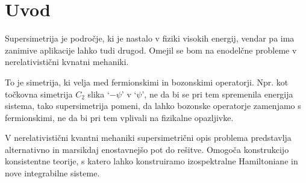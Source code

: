 \section{Uvod}

Supersimetrija je podro\v cje, ki je nastalo v fiziki visokih energij, vendar pa ima zanimive aplikacije lahko
tudi drugod. Omejil se bom na enodel\v cne probleme v nerelativisti\v cni kvnatni mehaniki.

To je simetrija, ki velja med fermionskimi in bozonskimi operatorji. Npr. kot to\v ckovna
simetrija $C_2$ slika `$-\psi$' v `$\psi$', ne da bi se pri tem spremenila energija sistema, tako supersimetrija pomeni, da lahko bozonske
operatorje zamenjamo s fermionskimi, ne da bi pri tem vplivali na fizikalne opazljivke.

V nerelativisti\v cni kvantni mehaniki supersimetri\v cni opis problema predstavlja alternativno in marsikdaj
enostavnej\v so pot do re\v sitve. Omogo\v ca konstrukcijo konsistentne teorije, s katero lahko konstruiramo izospektralne
Hamiltoniane in nove integrabilne sisteme.

